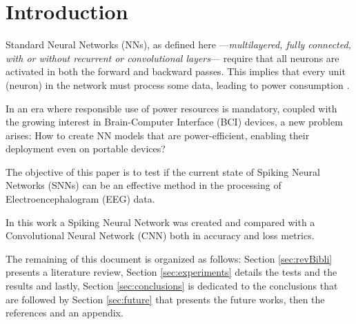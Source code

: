 \section{Introduction}
	\label{introduction}
	\par Standard Neural Networks (NNs), as defined here —\textit{multilayered, fully connected, with or without recurrent or convolutional layers}— require that all neurons are activated in both the forward and backward passes. This implies that every unit (neuron) in the network must process some data, leading to power consumption \cite{10242251}.
	
	\par In an era where responsible use of power resources is mandatory, coupled with the growing interest in Brain-Computer Interface (BCI) devices, a new problem arises: How to create NN models that are power-efficient, enabling their deployment even on portable devices?

	\par The objective of this paper is to test if the current state of Spiking Neural Networks (SNNs) can be an effective method in the processing of Electroencephalogram (EEG) data.
	
	\par In this work a Spiking Neural Network was created and compared with a Convolutional Neural Network (CNN) both in accuracy and loss metrics. 

	\par The remaining of this document is organized as follows: Section \ref{sec:revBibli} presents a literature review, Section \ref{sec:experiments} details the tests and the results and lastly, Section \ref{sec:conclusions} is dedicated to the conclusions that are followed by Section \ref{sec:future} that presents the future works, then the references and an appendix. 